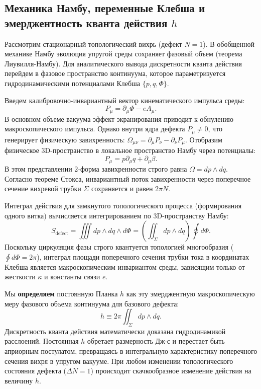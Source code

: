 \documentclass[11pt,a4paper]{article}
\begin{document}
	\subsection{Механика Намбу, переменные Клебша и эмерджентность кванта действия $h$}
	Рассмотрим стационарный топологический вихрь (дефект $N=1$). В обобщенной механике Намбу эволюция упругой среды сохраняет фазовый объем (теорема Лиувилля-Намбу). Для аналитического вывода дискретности кванта действия перейдем в фазовое пространство континуума, которое параметризуется гидродинамическими потенциалами Клебша $\{p, q, \Phi\}$.
	
	Введем калибровочно-инвариантный вектор кинематического импульса среды:
	\begin{equation}
		P_\mu = \partial_\mu \Phi - e A_\mu.
	\end{equation}
	В основном объеме вакуума эффект экранирования приводит к обнулению макроскопического импульса. Однако внутри ядра дефекта $P_\mu \neq 0$, что генерирует физическую завихренность: $\Omega_{\mu\nu} = \partial_\mu P_\nu - \partial_\nu P_\mu$. Отобразим физическое 3D-пространство в локальное пространство Намбу через потенциалы:
	\begin{equation}
		P_\mu = p \partial_\mu q + \partial_\mu \beta.
	\end{equation}
	В этом представлении 2-форма завихренности строго равна $\Omega = dp \wedge dq$. Согласно теореме Стокса, инвариантный поток завихренности через поперечное сечение вихревой трубки $\Sigma$ сохраняется и равен $2\pi N$.
	
	Интеграл действия для замкнутого топологического процесса (формирования одного витка) вычисляется интегрированием по 3D-пространству Намбу:
	\begin{equation}
		S_{\text{defect}} = \iiint dp \wedge dq \wedge d\Phi = \left( \iint_\Sigma dp \wedge dq \right) \oint d\Phi.
	\end{equation}
	Поскольку циркуляция фазы строго квантуется топологией многообразия ($\oint d\Phi = 2\pi$), интеграл площади поперечного сечения трубки тока в координатах Клебша является макроскопическим инвариантом среды, зависящим только от жесткости $\kappa$ и константы связи $e$.
	
	Мы \textbf{определяем} постоянную Планка $h$ как эту эмерджентную макроскопическую меру фазового объема континуума для базового дефекта:
	\begin{equation}
		h \equiv 2\pi \iint_\Sigma dp \wedge dq.
	\end{equation}
	Дискретность кванта действия математически доказана гидродинамикой расслоений. Постоянная $h$ обретает размерность Дж$\cdot$с и перестает быть априорным постулатом, превращаясь в интегральную характеристику поперечного сечения вихря в упругом вакууме. При любом изменении топологического состояния дефекта ($\Delta N = 1$) происходит скачкообразное изменение действия на величину $h$.
	
\end{document}
